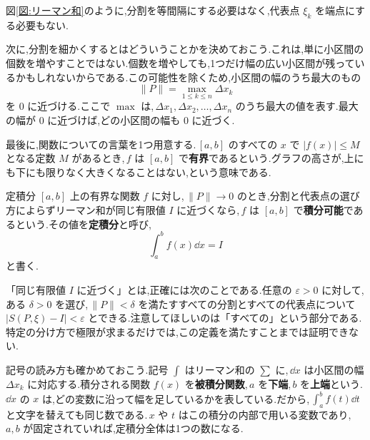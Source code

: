 図\ref{図:リーマン和}のように,分割を等間隔にする必要はなく,代表点 $\xi_k$ を端点にする必要もない.

次に,分割を細かくするとはどういうことかを決めておこう.これは,単に小区間の個数を増やすことではない.個数を増やしても,1つだけ幅の広い小区間が残っているかもしれないからである.この可能性を除くため,小区間の幅のうち最大のもの
\[
 \|P\|=\max_{1\le k\le n}\Delta x_k
\]
を $0$ に近づける.ここで $\max$ は,\,$\Delta x_1,\Delta x_2,\ldots,\Delta x_n$ のうち最大の値を表す.最大の幅が $0$ に近づけば,どの小区間の幅も $0$ に近づく.

最後に,関数についての言葉を1つ用意する.\,$[a,b]$ のすべての $x$ で $|f(x)|\le M$ となる定数 $M$ があるとき,\,$f$ は $[a,b]$ で\textbf{有界}であるという.グラフの高さが,上にも下にも限りなく大きくなることはない,という意味である.

\begin{definition}{定積分}
$[a,b]$ 上の有界な関数 $f$ に対し,\,$\|P\|\to0$ のとき,分割と代表点の選び方によらずリーマン和が同じ有限値 $I$ に近づくなら,\,$f$ は $[a,b]$ で\textbf{積分可能}であるという.その値を\textbf{定積分}と呼び,
\[
 \int_a^b f(x)\dd x=I
\]
と書く.
\end{definition}

「同じ有限値 $I$ に近づく」とは,正確には次のことである.任意の $\varepsilon>0$ に対して,ある $\delta>0$ を選び,\,$\|P\|<\delta$ を満たすすべての分割とすべての代表点について $|S(P,\xi)-I|<\varepsilon$ とできる.注意してほしいのは「すべての」という部分である.特定の分け方で極限が求まるだけでは,この定義を満たすことまでは証明できない.

記号の読み方も確かめておこう.記号 $\int$ はリーマン和の $\sum$ に,\,$\dd x$ は小区間の幅 $\Delta x_k$ に対応する.積分される関数 $f(x)$ を\textbf{被積分関数},\,$a$ を\textbf{下端},\,$b$ を\textbf{上端}という.\,$\dd x$ の $x$ は,どの変数に沿って幅を足しているかを表している.だから,\,$\int_a^b f(t)\dd t$ と文字を替えても同じ数である.\,$x$ や $t$ はこの積分の内部で用いる変数であり,\,$a,b$ が固定されていれば,定積分全体は1つの数になる.
